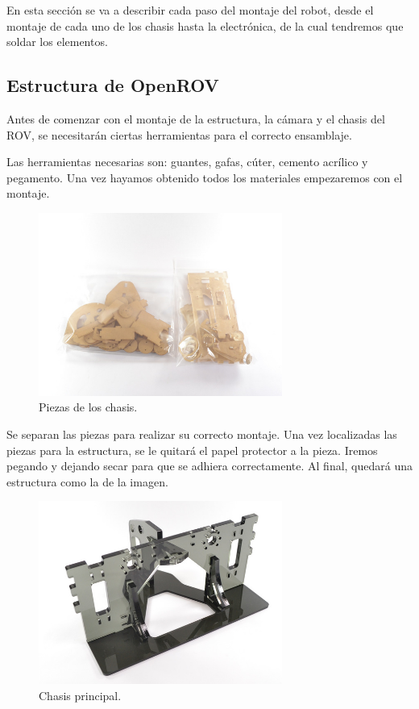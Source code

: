 En esta sección se va a describir cada paso del montaje del robot, desde el montaje de cada uno de los chasis hasta la electrónica, de la cual tendremos que soldar los elementos.

\subsection{Estructura de OpenROV}
\label{subsec:EstructuraOpenROV}

Antes de comenzar con el montaje de la estructura, la cámara y el chasis del ROV, se necesitarán ciertas herramientas para el correcto ensamblaje.

Las herramientas necesarias son: guantes, gafas, cúter, cemento acrílico y pegamento. Una vez hayamos obtenido todos los materiales empezaremos con el montaje.

\begin{figure} [hbtp]
  \begin{center}
    \includegraphics[width=8cm]{img/cap3/3_3/piezas}
  \end{center}
  \caption{Piezas de los chasis.}
  \label{fig:piezas}
\end{figure}

Se separan las piezas para realizar su correcto montaje. Una vez localizadas las piezas para la estructura, se le quitará el papel protector a la pieza. 
Iremos pegando y dejando secar para que se adhiera correctamente. 
Al final, quedará una estructura como la de la imagen.

\begin{figure} [hbtp]
  \begin{center}
    \includegraphics[width=8cm]{img/cap3/3_3/chasis_ppal}
  \end{center}
  \caption{Chasis principal.}
  \label{fig:chasis_ppal}
\end{figure}

